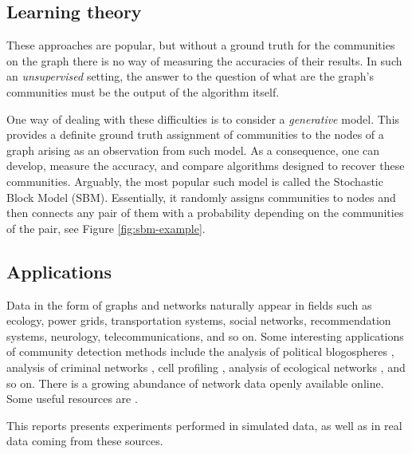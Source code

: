 \documentclass[../../main.tex]{subfiles} %
\begin{document}
\subsection{Learning theory}
These approaches are popular, but without a ground truth for the communities on 
the graph there is no way of measuring the accuracies of their results. In such 
an \textit{unsupervised} setting, the answer to the question of what are the 
graph's communities must be the output of the algorithm itself. 

One way of dealing with these difficulties is to consider a \textit{generative} 
model. This provides a definite ground truth assignment of communities to the 
nodes of a graph arising as an observation from such model. As a consequence, 
one can develop, measure the accuracy, and compare algorithms designed to 
recover these communities. Arguably, the most popular such model is called the 
Stochastic Block Model (SBM). Essentially, it randomly assigns communities to 
nodes and then connects any pair of them with a probability depending on the 
communities of the pair, see Figure \ref{fig:sbm-example}.

\subsection{Applications}
Data in the form of graphs and networks naturally appear in fields such as 
ecology, power grids, transportation systems, social networks, recommendation 
systems, neurology, telecommunications, and so on. Some interesting 
applications of community detection methods include the analysis of political 
blogospheres \cite{latouche_overlapping_2011}, 
analysis of criminal networks 
\cite{legramanti_extended_2022}, cell profiling \cite{morelli_nested_2021}, 
analysis of ecological networks \cite{miele_revealing_2017}, and so on. There 
is a growing abundance of network data openly available online. Some useful 
resources are \cite{newman-resources, pozo-resources, peixoto-resources, 
stanford-resources}.

This reports presents experiments performed in simulated data, as well as in 
real data coming from these sources.
\end{document}
